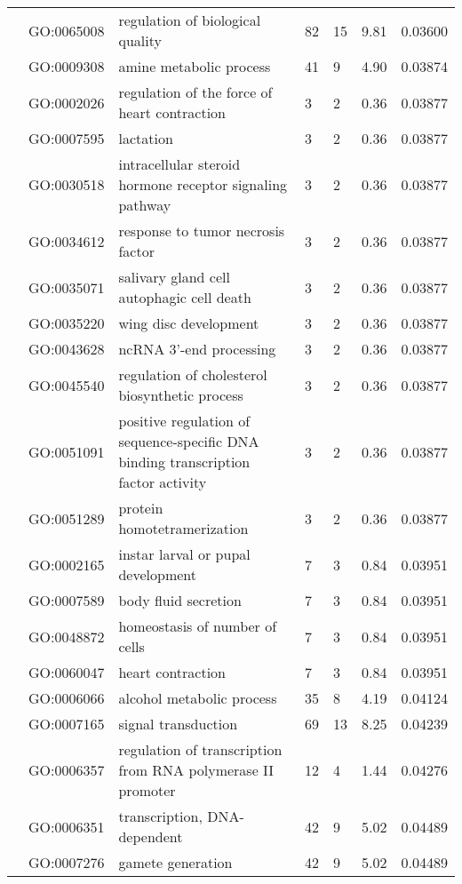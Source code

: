 \documentclass[10pt]{bmc_article}
\newenvironment{bmcformat}{\begin{raggedright}\baselineskip20pt\sloppy\setboolean{publ}{false}}{\end{raggedright}\baselineskip20pt\sloppy}
\begin{document}
\begin{bmcformat}
\begin{longtable}{p{1.7cm}lp{4.5cm}p{1cm}p{1cm}ll}
   & GO:0065008 & regulation of biological quality &  82 &  15 & 9.81 & 0.03600 \\ 
   & GO:0009308 & amine metabolic process &  41 &   9 & 4.90 & 0.03874 \\ 
   & GO:0002026 & regulation of the force of heart contraction &   3 &   2 & 0.36 & 0.03877 \\ 
   & GO:0007595 & lactation &   3 &   2 & 0.36 & 0.03877 \\ 
   & GO:0030518 & intracellular steroid hormone receptor signaling pathway &   3 &   2 & 0.36 & 0.03877 \\ 
   & GO:0034612 & response to tumor necrosis factor &   3 &   2 & 0.36 & 0.03877 \\ 
   & GO:0035071 & salivary gland cell autophagic cell death &   3 &   2 & 0.36 & 0.03877 \\ 
   & GO:0035220 & wing disc development &   3 &   2 & 0.36 & 0.03877 \\ 
   & GO:0043628 & ncRNA 3'-end processing &   3 &   2 & 0.36 & 0.03877 \\ 
   & GO:0045540 & regulation of cholesterol biosynthetic process &   3 &   2 & 0.36 & 0.03877 \\ 
   & GO:0051091 & positive regulation of sequence-specific DNA binding transcription factor activity &   3 &   2 & 0.36 & 0.03877 \\ 
   & GO:0051289 & protein homotetramerization &   3 &   2 & 0.36 & 0.03877 \\ 
   & GO:0002165 & instar larval or pupal development &   7 &   3 & 0.84 & 0.03951 \\ 
   & GO:0007589 & body fluid secretion &   7 &   3 & 0.84 & 0.03951 \\ 
   & GO:0048872 & homeostasis of number of cells &   7 &   3 & 0.84 & 0.03951 \\ 
   & GO:0060047 & heart contraction &   7 &   3 & 0.84 & 0.03951 \\ 
   & GO:0006066 & alcohol metabolic process &  35 &   8 & 4.19 & 0.04124 \\ 
   & GO:0007165 & signal transduction &  69 &  13 & 8.25 & 0.04239 \\ 
   & GO:0006357 & regulation of transcription from RNA polymerase II promoter &  12 &   4 & 1.44 & 0.04276 \\ 
   & GO:0006351 & transcription, DNA-dependent &  42 &   9 & 5.02 & 0.04489 \\ 
   & GO:0007276 & gamete generation &  42 &   9 & 5.02 & 0.04489 \\ 

\end{longtable}
\end{bmcformat}
\end{document}
